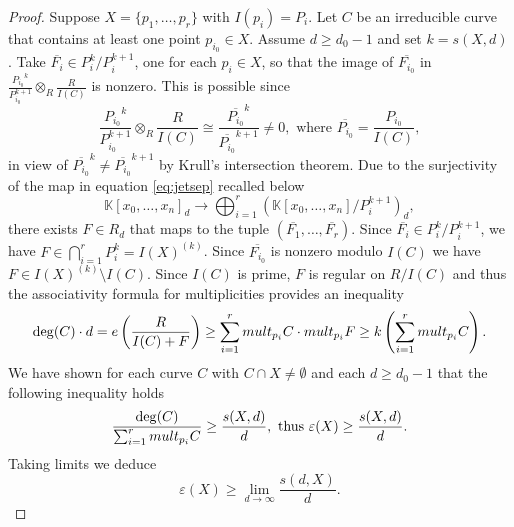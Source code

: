 \documentclass[12pt, reqno]{amsart}
\numberwithin{equation}{section}
\def\e{\ensuremath{\varepsilon}}
\newcommand{\kk}{\mathbb{K}}
\theoremstyle{plain} %
\theoremstyle{definition}
\theoremstyle{remark}
\begin{document}
\begin{proof}
Suppose $X=\{p_1,\ldots, p_r\}$ with $I(p_i)=P_i$. Let $C$ be an irreducible curve that contains at least one point  $p_{i_0}\in X$. Assume $d\geq d_0-1$ and set $k= s(X,d)$. Take $\overline{F_i}\in P_i^k/P_i^{k+1}$, one for each $p_i\in X$, so that the image of $\overline{F_{i_0}}$ in $\frac{{P_{i_0}}^k}{P_{i_0}^{k+1}}\otimes_R \frac{R}{I(C)}$ is nonzero. This is possible since\[
\frac{{P_{i_0}}^k}{P_{i_0}^{k+1}}\otimes_R \frac{R}{I(C)}\cong\frac{\overline{P_{i_0}}^k}{\overline{P_{i_0}}^{k+1}}\neq 0 , \text{ where } \overline{P_{i_0}}=\frac{P_{i_0}}{I(C)},
\]
in view of  $\overline{P_{i_0}}^k\neq \overline{P_{i_0}}^{k+1}$ by Krull's intersection theorem.
Due to the surjectivity of the map in equation \eqref{eq:jetsep} recalled below
\[
\kk[x_0,\ldots,x_n]_d \to \bigoplus_{i=1}^r \left(\kk[x_0,\ldots,x_n]/P_i^{k+1}\right)_d ,
\]
 there exists $F\in R_d$ that maps to the tuple $(\overline{F_1}, \ldots, \overline{F_r})$. Since $\overline{F_i}\in P_i^k/P_i^{k+1}$, we have $F\in \bigcap_{i=1}^r P_i^k= I(X)^{(k)}$. Since $\overline{F_{i_0}}$ is nonzero modulo $I(C)$ we have $F\in I(X)^{(k)}\setminus I(C)$. Since $I(C)$ is prime,  $F$ is regular on $R/I(C)$ and thus the associativity formula for multiplicities provides an inequality
\[
\deg(C)\cdot d=e\left(\frac{R}{I(C)+F}\right)\geq \sum_{i=1}^r {\rm mult}_{p_i} C \cdot {\rm mult}_{p_i} F \geq k \left(\sum_{i=1}^r {\rm mult}_{p_i} C \right).
\]
We have shown for each curve $C$ with $C\cap X\neq \emptyset$ and each $d\geq d_0-1$ that the following inequality holds
\[
\frac{\deg(C)}{\sum_{i=1}^r {\rm mult}_{p_i} C} \geq\frac{s(X,d)}{d}, \text{ thus } \e(X) \geq\frac{s(X,d)}{d}.
\]
Taking limits  we deduce
\begin{equation}
\label{eq:Seshadrigreater}
 \e(X) \geq\lim_{d\to \infty} \frac{s(d,X)}{d}.
\end{equation}


\end{proof}
\end{document}
